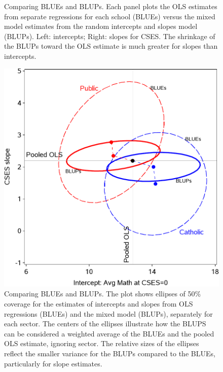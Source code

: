 \begin{figure}[htb]
\begin{minipage}[b]{.49\linewidth}
 \end{minipage}
  \caption{Comparing BLUEs and BLUPs. Each panel plots the OLS estimates from separate regressions for each school (BLUEs)
  versus the mixed model estimates from the random intercepts and slopes model (BLUPs).
  Left: intercepts; Right: slopes for CSES.  The shrinkage of the BLUPs toward the OLS estimate is much greater for slopes than
  intercepts. }
  \label{fig:hsbmix4}
\end{figure}


\begin{figure}[htb!]
  \centering
  \includegraphics[width=.6\textwidth,clip]{fig/hsbmix43}
  \caption{Comparing BLUEs and BLUPs. The plot shows ellipses of 50\% coverage for the estimates of intercepts and slopes
  from OLS regressions (BLUEs) and the mixed model (BLUPs), separately for each sector.
  The centers of the ellipses illustrate how the BLUPS can be considered a weighted average of the BLUEs and the
  pooled OLS estimate, ignoring sector. The relative sizes of the ellipses reflect the smaller variance for the
  BLUPs compared to the BLUEs, particularly for slope estimates. }%
  \label{fig:hsbmix43}
\end{figure}
